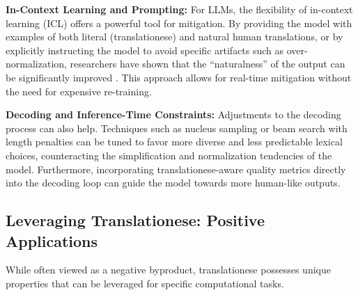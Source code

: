 \documentclass[11pt,a4paper]{article}
\begin{document}
\textbf{In-Context Learning and Prompting:} For LLMs, the flexibility of in-context learning (ICL) offers a powerful tool for mitigation. By providing the model with examples of both literal (translationese) and natural human translations, or by explicitly instructing the model to avoid specific artifacts such as over-normalization, researchers have shown that the ``naturalness'' of the output can be significantly improved \cite{wang2024benchmarking,agrawal2023incontext}. This approach allows for real-time mitigation without the need for expensive re-training.

\textbf{Decoding and Inference-Time Constraints:} Adjustments to the decoding process can also help. Techniques such as nucleus sampling or beam search with length penalties can be tuned to favor more diverse and less predictable lexical choices, counteracting the simplification and normalization tendencies of the model. Furthermore, incorporating translationese-aware quality metrics directly into the decoding loop can guide the model towards more human-like outputs.

\subsection{Leveraging Translationese: Positive Applications}

While often viewed as a negative byproduct, translationese possesses unique properties that can be leveraged for specific computational tasks.
\end{document}
